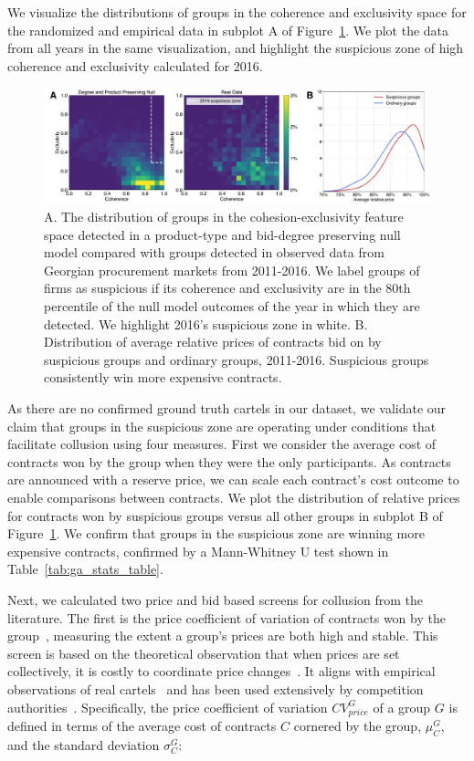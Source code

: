 We visualize the distributions of groups in the coherence and exclusivity space for the randomized and empirical data in subplot A of Figure~\ref{fig:ga_results}. We plot the data from all years in the same visualization, and highlight the suspicious zone of high coherence and exclusivity calculated for 2016.

\begin{figure}[t]
\centering
\includegraphics[width=\textwidth]{images/cartels/ga_2d_dists_and_rel_price_kdes.pdf}
\caption[Coherence and Exclusivity of Georgian groups.]{A. The distribution of groups in the cohesion-exclusivity feature space detected in a product-type and bid-degree preserving null model compared with groups detected in observed data from Georgian procurement markets from 2011-2016. We label groups of firms as suspicious if its coherence and exclusivity are in the 80th percentile of the null model outcomes of the year in which they are detected. We highlight 2016's suspicious zone in white.  B. Distribution of average relative prices of contracts bid on by suspicious groups and ordinary groups, 2011-2016. Suspicious groups consistently win more expensive contracts.}
\label{fig:ga_results}
\end{figure}

As there are no confirmed ground truth cartels in our dataset, we validate our claim that groups in the suspicious zone are operating under conditions that facilitate collusion using four measures. First we consider the average cost of contracts won by the group when they were the only participants. As contracts are announced with a reserve price, we can scale each contract's cost outcome to enable comparisons between contracts. We plot the distribution of relative prices for contracts won by suspicious groups versus all other groups in subplot B of Figure~\ref{fig:ga_results}. We confirm that groups in the suspicious zone are winning more expensive contracts, confirmed by a Mann-Whitney U test shown in Table~\ref{tab:ga_stats_table}.

Next, we calculated two price and bid based screens for collusion from the literature. The first is the price coefficient of variation of contracts won by the group~\cite{abrantes2006variance}, measuring the extent a group's prices are both high and stable. This screen is based on the theoretical observation that when prices are set collectively, it is costly to coordinate price changes~\cite{lacasse1995bid}. It aligns with empirical observations of real cartels~\cite{bolotova2008impact} and has been used extensively by competition authorities~\cite{abrantes2012lessons}. Specifically, the price coefficient of variation $CV_{price}^{G}$ of a group $G$ is defined in terms of the average cost of contracts $C$ cornered by the group, $\mu_{C}^{G}$, and the standard deviation  $\sigma_{C}^{G}$:

